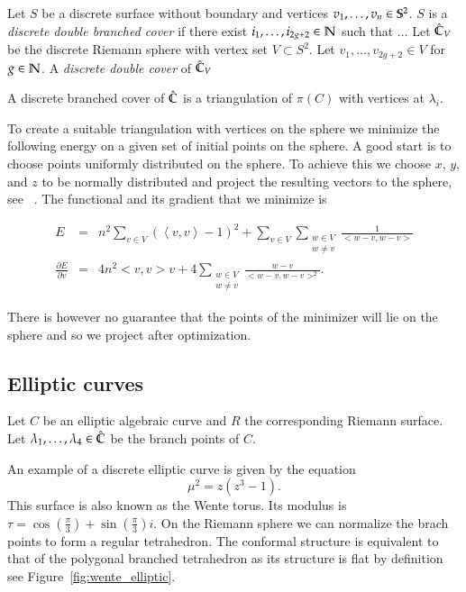 \documentclass[Thesis.tex]{subfiles}
\begin{document}
\begin{definition}
Let $S$ be a discrete surface without boundary and vertices
$v_1,\ldots,v_n\in\S^2$. $S$ is a \emph{discrete double branched cover} if
there exist $i_1,\ldots, i_{2g+2}\in \N$ such that ...  Let $\Chat_V$ be the discrete Riemann sphere with vertex set
$V\subset S^2$. Let $v_1, \ldots,v_{2g+2} \in V$ for $g\in \N$. A
\emph{discrete double cover} of $\Chat_V$ \end{definition}

A discrete branched cover of $\Chat$ is a triangulation of $\pi(C)$ with
vertices at $\lambda_i$.


To create a suitable triangulation with vertices on the sphere we minimize the
following energy on a given set of initial points on the sphere. A good start
is to choose points uniformly distributed on the sphere. To achieve this we
choose $x$, $y$, and $z$ to be normally distributed and project the resulting
vectors to the sphere, see~ \cite{Muller1959}. The functional and its gradient
that we minimize is

\begin{eqnarray*}
	E &=& n^2\sum_{v\in V}\left( \left<v,v\right> - 1\right)^2 + \sum_{v\in V}\sum_{\substack{w\in V\\w\neq v}} \frac{1}{<w-v, w-v>}\\
	\frac{\partial E}{\partial v} &=& 4n^2<v,v>v + 4\sum_{\substack{w\in V\\w\neq v}}\frac{w-v}{<w-v,w-v>^2}.
\end{eqnarray*}

There is however no guarantee that the points of the minimizer will lie on the
sphere and so we project after optimization.


\subsection{Elliptic curves}
\label{sec:examples_elliptic}

Let $C$ be an elliptic algebraic curve and $R$ the corresponding Riemann
surface. Let $\lambda_1, \ldots, \lambda_4 \in \Chat$ be the branch points of
$C$. 

\begin{example}
\label{ex:wente_elliptic}
An example of a discrete elliptic curve is given by the equation
\begin{equation} \mu^2=z(z^3-1).  \end{equation} This surface is also known as
the Wente torus. Its modulus is $\tau=\cos(\frac{\pi}{3})+\sin(\frac{\pi}{3})i$. On the Riemann
sphere we can normalize the brach points to form a regular tetrahedron. The
conformal structure is equivalent to that of the polygonal branched
tetrahedron as its structure is flat by definition see
Figure~\ref{fig:wente_elliptic}.  
\end{example}
\end{document}

